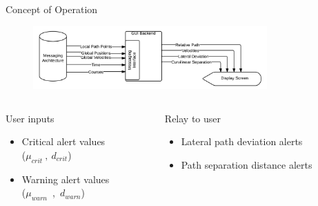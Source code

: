 \documentclass{beamer}
\begin{document}
    \begin{frame}{Concept of Operation}
      \begin{figure}
        \includegraphics[width=0.8\textwidth]{../graphics/blackbox_flowchart.png}
      \end{figure}
      \begin{columns}  
        \begin{column}{0.5\textwidth}
          \footnotesize User inputs
          \begin{itemize} \footnotesize
            \item Critical alert values\\ ($\mu_{crit}~,~d_{crit}$)
            \item Warning alert values\\ ($\mu_{warn}$~,~$d_{warn}$)
          \end{itemize}
        \end{column}
        \begin{column}{0.5\textwidth}
          \footnotesize Relay to user
          \begin{itemize} \footnotesize
            \item Lateral path deviation alerts
            \item Path separation distance alerts
          \end{itemize}
        \end{column}
      \end{columns}
    \end{frame}

      
\end{document}
